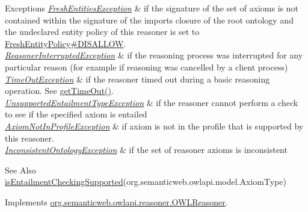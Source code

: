\begin{DoxyExceptions}{Exceptions}
{\em \hyperlink{classorg_1_1semanticweb_1_1owlapi_1_1reasoner_1_1_fresh_entities_exception}{Fresh\-Entities\-Exception}} & if the signature of the set of axioms is not contained within the signature of the imports closure of the root ontology and the undeclared entity policy of this reasoner is set to \hyperlink{enumorg_1_1semanticweb_1_1owlapi_1_1reasoner_1_1_fresh_entity_policy_a762eae6d5b2449d125311ecaabfdc8d0}{Fresh\-Entity\-Policy\#\-D\-I\-S\-A\-L\-L\-O\-W}. \\
\hline
{\em \hyperlink{classorg_1_1semanticweb_1_1owlapi_1_1reasoner_1_1_reasoner_interrupted_exception}{Reasoner\-Interrupted\-Exception}} & if the reasoning process was interrupted for any particular reason (for example if reasoning was cancelled by a client process) \\
\hline
{\em \hyperlink{classorg_1_1semanticweb_1_1owlapi_1_1reasoner_1_1_time_out_exception}{Time\-Out\-Exception}} & if the reasoner timed out during a basic reasoning operation. See \hyperlink{classorg_1_1semanticweb_1_1owlapi_1_1reasoner_1_1impl_1_1_o_w_l_reasoner_base_af55342eaaabb1b72dacfde7a181b93d2}{get\-Time\-Out()}. \\
\hline
{\em \hyperlink{classorg_1_1semanticweb_1_1owlapi_1_1reasoner_1_1_unsupported_entailment_type_exception}{Unsupported\-Entailment\-Type\-Exception}} & if the reasoner cannot perform a check to see if the specified axiom is entailed \\
\hline
{\em \hyperlink{classorg_1_1semanticweb_1_1owlapi_1_1reasoner_1_1_axiom_not_in_profile_exception}{Axiom\-Not\-In\-Profile\-Exception}} & if {\ttfamily axiom} is not in the profile that is supported by this reasoner. \\
\hline
{\em \hyperlink{classorg_1_1semanticweb_1_1owlapi_1_1reasoner_1_1_inconsistent_ontology_exception}{Inconsistent\-Ontology\-Exception}} & if the set of reasoner axioms is inconsistent \\
\hline
\end{DoxyExceptions}
\begin{DoxySeeAlso}{See Also}
\hyperlink{classorg_1_1semanticweb_1_1owlapi_1_1reasoner_1_1structural_1_1_structural_reasoner_a275ef13de2d55b0123ff94bce52ea78b}{is\-Entailment\-Checking\-Supported}(org.\-semanticweb.\-owlapi.\-model.\-Axiom\-Type) 
\end{DoxySeeAlso}


Implements \hyperlink{interfaceorg_1_1semanticweb_1_1owlapi_1_1reasoner_1_1_o_w_l_reasoner_a843b4375e26a5f12fd06566fc7807c9e}{org.\-semanticweb.\-owlapi.\-reasoner.\-O\-W\-L\-Reasoner}.

